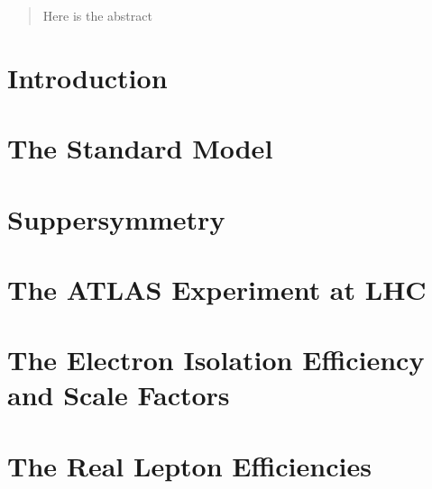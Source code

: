 \documentclass[hyperlinks]{outhesis}
\begin{document}
\begin{abstract}
Here is the abstract
\end{abstract}

\frontmatter

\maketitle

\mainmatter

\hypersetup{linkcolor=blue}


\chapter{Introduction}
\label{chapter:introduction}
\graphicspath{{figures/introduction/}}



\chapter{The Standard Model}
\label{chapter:the_standard_model}
\graphicspath{{figures/the_standard_model/}}



\chapter{Suppersymmetry}
\label{chapter:Suppersymmetry}
\graphicspath{{figures/Suppersymmetry/}}



\chapter{The ATLAS Experiment at LHC}
\label{chapter:altas_experiment}
\graphicspath{{figures/atlas_experiment/}}



\chapter{The Electron Isolation Efficiency and Scale Factors}
\label{chapter:electron_isolation}
\graphicspath{{figures/electron_isolation}}



\chapter{The Real Lepton Efficiencies}
\label{chapter:real_lepton_efficiencies}
\graphicspath{{figures/real_lepton_efficiencies}}

\end{document}

